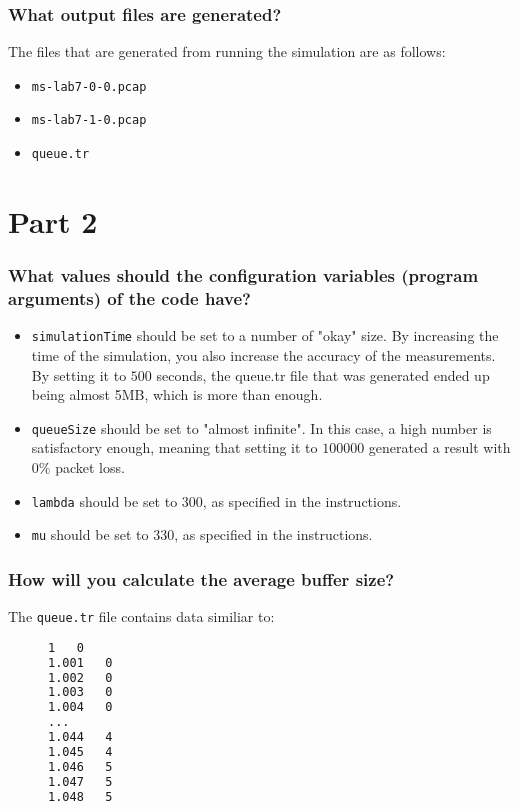 \documentclass[a4paper, titlepage,12pt]{article}
\begin{document}
		\subsubsection*{What output files are generated?}

			The files that are generated from running the simulation are as follows:

			\begin{itemize}
				\item \verb|ms-lab7-0-0.pcap|
				\item \verb|ms-lab7-1-0.pcap|
				\item \verb|queue.tr|
			\end{itemize}

	\section*{Part 2}
		\subsubsection*{What values should the configuration variables (program arguments) of the code have?}
			\begin{itemize}
				\item \verb|simulationTime| should be set to a number of "okay" size. By increasing the time of the simulation, you also increase the accuracy of the measurements. By setting it to $500$ seconds, the queue.tr file that was generated ended up being almost 5MB, which is more than enough.
				\item \verb|queueSize| should be set to "almost infinite". In this case, a high number is satisfactory enough, meaning that setting it to $100 000$ generated a result with $0\%$ packet loss.
				\item \verb|lambda| should be set to $300$, as specified in the instructions.
				\item \verb|mu| should be set to $330$, as specified in the instructions.
			\end{itemize}

		\subsubsection*{How will you calculate the average buffer size?}
			The \verb|queue.tr| file contains data similiar to:

			\begin{figure}[h!]
				\begin{lstlisting}[language=sh]
1	0
1.001	0
1.002	0
1.003	0
1.004	0
...
1.044	4
1.045	4
1.046	5
1.047	5
1.048	5

				\end{lstlisting}
			\end{figure}
\end{document}
